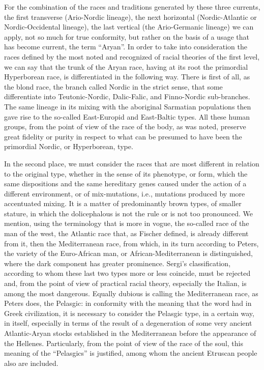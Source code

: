 For the combination of the races and traditions generated by these three currents, the first transverse (Ario-Nordic lineage), the next horizontal (Nordic-Atlantic or Nordic-Occidental lineage), the last vertical (the Ario-Germanic lineage) we can apply, not so much for true conformity, but rather on the basis of a usage that has become current, the term ``Aryan''. In order to take into consideration the races defined by the most noted and recognized of racial theories of the first level, we can say that the trunk of the Aryan race, having at its root the primordial Hyperborean race, is differentiated in the following way. There is first of all, as the blond race, the branch called Nordic in the strict sense, that some differentiate into Teutonic-Nordic, Dalic-Falic, and Finno-Nordic sub-branches. The same lineage in its mixing with the aboriginal Sarmatian populations then gave rise to the so-called East-Europid and East-Baltic types. All these human groups, from the point of view of the race of the body, as was noted, preserve great fidelity or purity in respect to what can be presumed to have been the primordial Nordic, or Hyperborean, type.

In the second place, we must consider the races that are most different in relation to the original type, whether in the sense of its phenotype, or form, which the same dispositions and the same hereditary genes caused under the action of a different environment, or of mix-mutations, i.e., mutations produced by more accentuated mixing. It is a matter of predominantly brown types, of smaller stature, in which the dolicephalous is not the rule or is not too pronounced. We mention, using the terminology that is more in vogue, the so-called race of the man of the west, the Atlantic race that, as Fischer defined, is already different from it, then the Mediterranean race, from which, in its turn according to Peters, the variety of the Euro-African man, or African-Mediterranean is distinguished, where the dark component has greater prominence. Sergi's classification, according to whom these last two types more or less coincide, must be rejected and, from the point of view of practical racial theory, especially the Italian, is among the most dangerous. Equally dubious is calling the Mediterranean race, as Peters does, the Pelasgic: in conformity with the meaning that the word had in Greek civilization, it is necessary to consider the Pelasgic type, in a certain way, in itself, especially in terms of the result of a degeneration of some very ancient Atlantic-Aryan stocks established in the Mediterranean before the appearance of the Hellenes. Particularly, from the point of view of the race of the soul, this meaning of the ``Pelasgics'' is justified, among whom the ancient Etruscan people also are included.

